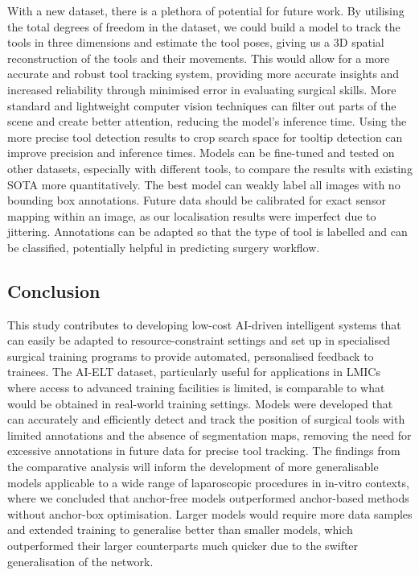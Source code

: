 With a new dataset, there is a plethora of potential for future work. By utilising the total degrees of freedom in the dataset, we could build a model to track the tools in three dimensions and estimate the tool poses, giving us a 3D spatial reconstruction of the tools and their movements. This would allow for a more accurate and robust tool tracking system, providing more accurate insights and increased reliability through minimised error in evaluating surgical skills. More standard and lightweight computer vision techniques can filter out parts of the scene and create better attention, reducing the model's inference time. Using the more precise tool detection results to crop search space for tooltip detection can improve precision and inference times. Models can be fine-tuned and tested on other datasets, especially with different tools, to compare the results with existing SOTA more quantitatively. The best model can weakly label all images with no bounding box annotations. Future data should be calibrated for exact sensor mapping within an image, as our localisation results were imperfect due to jittering. Annotations can be adapted so that the type of tool is labelled and can be classified, potentially helpful in predicting surgery workflow.

\subsection{Conclusion}
 
This study contributes to developing low-cost AI-driven intelligent systems that can easily be adapted to resource-constraint settings and set up in specialised surgical training programs to provide automated, personalised feedback to trainees. The AI-ELT dataset, particularly useful for applications in LMICs where access to advanced training facilities is limited, is comparable to what would be obtained in real-world training settings. Models were developed that can accurately and efficiently detect and track the position of surgical tools with limited annotations and the absence of segmentation maps, removing the need for excessive annotations in future data for precise tool tracking. The findings from the comparative analysis will inform the development of more generalisable models applicable to a wide range of laparoscopic procedures in in-vitro contexts, where we concluded that anchor-free models outperformed anchor-based methods without anchor-box optimisation. Larger models would require more data samples and extended training to generalise better than smaller models, which outperformed their larger counterparts much quicker due to the swifter generalisation of the network.

